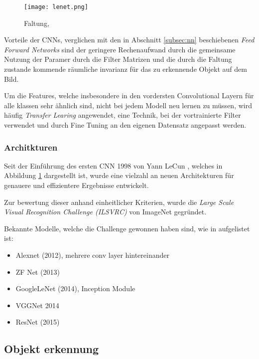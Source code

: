 \begin{figure}[H]
    \centering
    \label{fig:lenet}
    \texttt{[image: lenet.png]}
    \caption{Faltung, \cite{lecunGradientBasedLearningApplied1998}}
\end{figure}


Vorteile der CNNs, verglichen mit den in Abschnitt \ref{subsec:nn} beschiebenen 
\textit{Feed Forward Networks} sind der geringere Rechenaufwand
durch die gemeinsame Nutzung der Paramer durch die Filter Matrizen und die durch die 
Faltung zustande kommende räumliche invarianz für das zu erkennende 
Objekt auf dem Bild.

Um die Features, welche insbesondere in den vordersten Convolutional 
Layern für alle klassen sehr ähnlich sind, nicht bei jedem Modell
neu lernen zu müssen, wird häufig \textit{Transfer Learing} angewendet, 
eine Technik, bei der vortrainierte Filter verwendet und durch Fine 
Tuning an den eigenen Datensatz angepasst werden.


\subsubsection{Architkturen}\label{subsubsec:architecture}

Seit der Einführung des ersten CNN 1998 von Yann LeCun
\cite{lecunGradientBasedLearningApplied1998}, welches in 
Abbildung \ref{fig:lenet} dargestellt ist, wurde eine 
vielzahl an neuen Architekturen für genauere und effizientere
Ergebnisse entwickelt.

Zur bewertung dieser anhand einheitlicher Kriterien,
wurde die \textit{Large Scale Visual Recognition Challenge (ILSVRC)}
\cite{ImageNetLargeScale} von ImageNet gegründet.

Bekannte Modelle, welche die Challenge gewonnen haben 
sind, wie in \cite{StanfordCS231nConvolutional} aufgelistet ist:


\begin{itemize}
    \item Alexnet (2012), mehrere conv layer hintereinander
    \item ZF Net (2013)
    \item GoogleLeNet (2014), Inception Module
    \item VGGNet 2014
    \item ResNet (2015)
\end{itemize}



\subsection{Objekt erkennung}\label{subsec:objdet_det}

